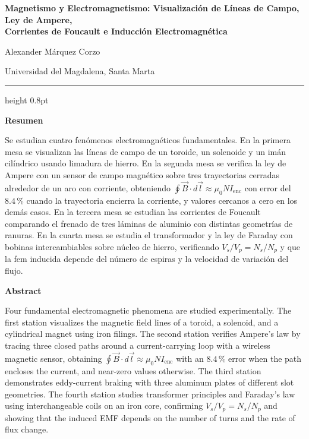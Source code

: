 \documentclass[10pt]{article}
\begin{document}
\begin{center}
{\large\bfseries
Magnetismo y Electromagnetismo: Visualización de Líneas de Campo, Ley de Ampere,\\
Corrientes de Foucault e Inducción Electromagnética}

\vspace{5pt}
{\normalsize Alexander Márquez Corzo}

\vspace{2pt}
{\small Universidad del Magdalena, Santa Marta}
\end{center}

\vspace{6pt}
\hrule height 0.8pt
\vspace{6pt}

\begin{center}{\small\bfseries Resumen}\end{center}
{\small
Se estudian cuatro fenómenos electromagnéticos fundamentales. En la primera mesa se visualizan las líneas de campo de un toroide, un solenoide y un imán cilíndrico usando limadura de hierro. En la segunda mesa se verifica la ley de Ampere con un sensor de campo magnético sobre tres trayectorias cerradas alrededor de un aro con corriente, obteniendo $\oint \vec{B}\cdot d\vec{l} \approx \mu_0 N I_{\text{enc}}$ con error del $8.4\,\%$ cuando la trayectoria encierra la corriente, y valores cercanos a cero en los demás casos. En la tercera mesa se estudian las corrientes de Foucault comparando el frenado de tres láminas de aluminio con distintas geometrías de ranuras. En la cuarta mesa se estudia el transformador y la ley de Faraday con bobinas intercambiables sobre núcleo de hierro, verificando $V_s/V_p = N_s/N_p$ y que la fem inducida depende del número de espiras y la velocidad de variación del flujo.}

\vspace{5pt}
\begin{center}{\small\bfseries Abstract}\end{center}
{\small
Four fundamental electromagnetic phenomena are studied experimentally. The first station visualizes the magnetic field lines of a toroid, a solenoid, and a cylindrical magnet using iron filings. The second station verifies Ampere's law by tracing three closed paths around a current-carrying loop with a wireless magnetic sensor, obtaining $\oint \vec{B}\cdot d\vec{l} \approx \mu_0 N I_{\text{enc}}$ with an $8.4\,\%$ error when the path encloses the current, and near-zero values otherwise. The third station demonstrates eddy-current braking with three aluminum plates of different slot geometries. The fourth station studies transformer principles and Faraday's law using interchangeable coils on an iron core, confirming $V_s/V_p = N_s/N_p$ and showing that the induced EMF depends on the number of turns and the rate of flux change.}
\end{document}
